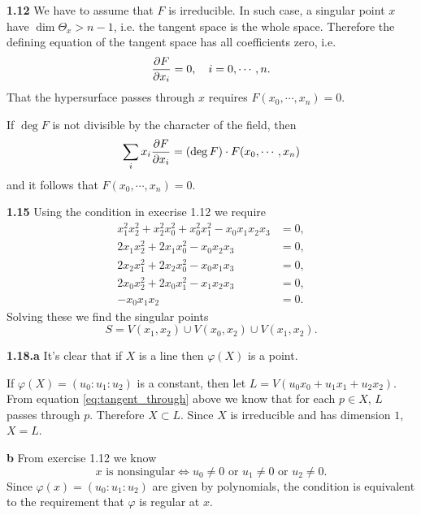 \documentclass{article}
\makeatletter
\newcommand*{\shifttext}[1]{%
  \settowidth{\@tempdima}{#1}%
  \hspace{-\@tempdima}#1%
}
\newcommand{\plabel}[1]{%
\shifttext{\textbf{#1}\quad}%
}
\makeatother
\begin{document}
\plabel{1.12}%
We have to assume that $F$ is irreducible.
In such case, a singular point $x$ have $\dim\Theta_{x} > n-1$, i.e. the tangent space is the whole space.
Therefore the defining equation of the tangent space has all coefficients zero, i.e.
\[ \pdv{F}{x_i}(x_0,\cdots,x_n) = 0,\quad i = 0,\cdots,n. \]
That the hypersurface passes through $x$ requires $F(x_0,\cdots,x_n) = 0$.
\par
If $\deg F$ is not divisible by the character of the field, then
\begin{align}
    \label{eq:tangent_through} \sum_i x_i\pdv{F}{x_i}(x_0,\cdots,x_n) = (\deg F) \cdot F(x_0,\cdots,x_n)
\end{align}
and it follows that $F(x_0,\cdots,x_n) = 0$.

\plabel{1.15}%
Using the condition in execrise 1.12 we require
\begin{align*}
    x_1^2 x_2^2 + x_2^2 x_0^2 + x_0^2 x_1^2 - x_0 x_1 x_2 x_3 &= 0, \\
    2 x_1 x_2^2 + 2x_1 x_0^2 - x_0 x_2 x_3 &= 0, \\
    2 x_2 x_1^2 + 2x_2 x_0^2 - x_0 x_1 x_3 &= 0, \\
    2 x_0 x_2^2 + 2x_0 x_1^2 - x_1 x_2 x_3 &= 0, \\
    -x_0 x_1 x_2 &= 0.
\end{align*}
Solving these we find the singular points
\[ S = V(x_1,x_2) \cup V(x_0,x_2) \cup V(x_1,x_2). \]

\plabel{1.18.a}%
It's clear that if $X$ is a line then $\varphi(X)$ is a point.
\par
If $\varphi(X) = (u_0:u_1:u_2)$ is a constant, then let $L = V(u_0 x_0 + u_1 x_1 + u_2 x_2)$.
From equation \eqref{eq:tangent_through} above we know that for each $p\in X$, $L$ passes through $p$.
Therefore $X\subset L$.
Since $X$ is irreducible and has dimension $1$, $X = L$.

\plabel{b}%
From exercise 1.12 we know
\[ x \text{ is nonsingular} \Leftrightarrow u_0\neq 0 \text{ or } u_1\neq 0 \text{ or } u_2 \neq 0. \]
Since $\varphi(x) = (u_0:u_1:u_2)$ are given by polynomials, the condition is equivalent to the requirement that $\varphi$ is regular at $x$.
\end{document}
